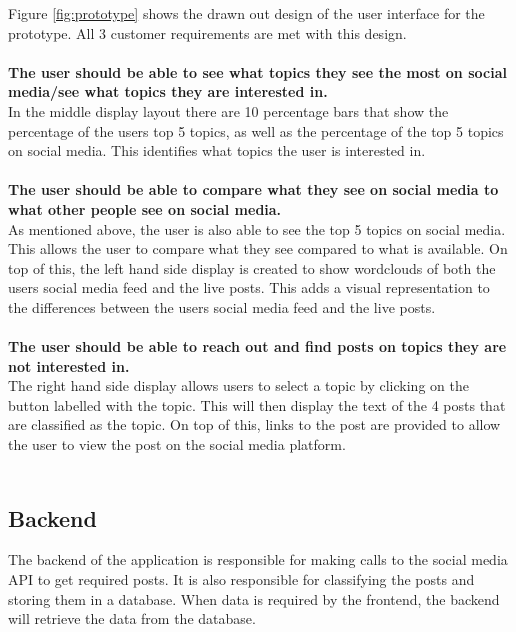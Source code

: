 \newpage
Figure \ref{fig:prototype} shows the drawn out design of the user interface for the prototype. All 3 customer requirements are met
with this design.\\\\
\textbf{The user should be able to see what topics they see the most on social media/see what topics they are interested in.}\\
In the middle display layout there are 10 percentage bars that show the percentage of the users top 5 topics, as well as the percentage
of the top 5 topics on social media. This identifies what topics the user is interested in.\\\\
\textbf{The user should be able to compare what they see on social media to what other people see on social media.}\\
As mentioned above, the user is also able to see the top 5 topics on social media. This allows the user to compare what they see
compared to what is available. On top of this, the left hand side display is created to show wordclouds of both the users social media feed
and the live posts. This adds a visual representation to the differences between the users social media feed and the live posts.\\\\
\textbf{The user should be able to reach out and find posts on topics they are not interested in.}\\
The right hand side display allows users to select a topic by clicking on the button labelled with the topic. This will then display the text
 of the 4 posts that are classified as the topic. On top of this, links to the post are provided to allow the user to view the post on the social
media platform.\\\\
\subsection{Backend}
The backend of the application is responsible for making calls to the social media API to get required posts. It is also responsible
for classifying the posts and storing them in a database. When data is required by the frontend, the backend will retrieve the data
from the database.\\

